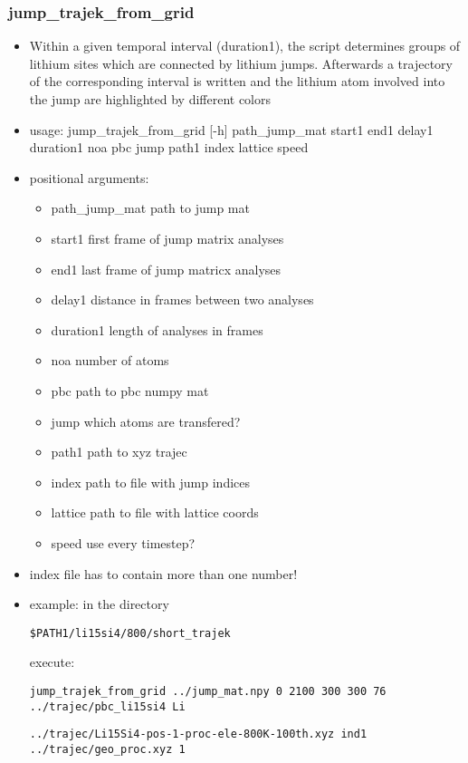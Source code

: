 \documentclass{article}
\begin{document}
\subsubsection{jump\_trajek\_from\_grid}
\begin{itemize}
 \item  Within a given temporal interval (duration1), the script determines groups of lithium sites which are connected by lithium jumps. Afterwards a trajectory of the corresponding interval is written and the lithium atom involved into the jump are highlighted by different colors
\item usage: jump\_trajek\_from\_grid [-h] path\_jump\_mat start1 end1 delay1 duration1 noa pbc jump path1 index lattice speed

\item positional arguments:
 \begin{itemize}
\item  path\_jump\_mat  path to jump mat
\item  start1         first frame of jump matrix analyses
 \item end1           last frame of jump matricx analyses
 \item delay1         distance in frames between two analyses
 \item duration1      length of analyses in frames
 \item noa            number of atoms
 \item pbc            path to pbc numpy mat
 \item jump           which atoms are transfered?
 \item path1          path to xyz trajec
 \item index          path to file with jump indices
\item  lattice        path to file with lattice coords
 \item  speed         use every timestep?
  \end{itemize}
  \item index file has to contain more than one number!
  \item example:  in the directory \begin{verbatim}$PATH1/li15si4/800/short_trajek\end{verbatim} execute:\\
  \begin{verbatim}jump_trajek_from_grid ../jump_mat.npy 0 2100 300 300 76 ../trajec/pbc_li15si4 Li \end{verbatim} \begin{verbatim}../trajec/Li15Si4-pos-1-proc-ele-800K-100th.xyz ind1 ../trajec/geo_proc.xyz 1\end{verbatim}
 
\end{itemize}
%
%
\end{document}
